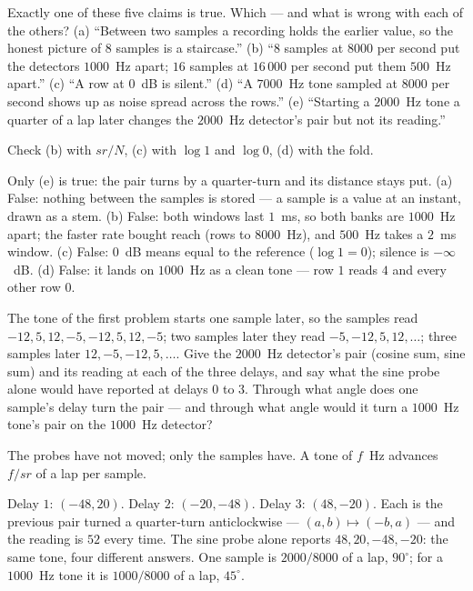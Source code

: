 \begin{problem}
Exactly one of these five claims is true. Which — and what is wrong
with each of the others? (a) ``Between two samples a recording holds
the earlier value, so the honest picture of $8$ samples is a
staircase.'' (b) ``$8$ samples at $8000$ per second put the detectors
$1000$~Hz apart; $16$ samples at $16\,000$ per second put them $500$~Hz
apart.'' (c) ``A row at $0$~dB is silent.'' (d) ``A $7000$~Hz tone
sampled at $8000$ per second shows up as noise spread across the
rows.'' (e) ``Starting a $2000$~Hz tone a quarter of a lap later
changes the $2000$~Hz detector's pair but not its reading.''
\begin{hint}
Check (b) with $sr/N$, (c) with $\log 1$ and $\log 0$, (d) with the
fold.
\end{hint}
\begin{solution}
Only (e) is true: the pair turns by a quarter-turn and its distance
stays put. (a) False: nothing between the samples is stored — a sample
is a value at an instant, drawn as a stem. (b) False: both windows last
$1$~ms, so both banks are $1000$~Hz apart; the faster rate bought reach
(rows to $8000$~Hz), and $500$~Hz takes a $2$~ms window. (c) False:
$0$~dB means equal to the reference ($\log 1 = 0$); silence is
$-\infty$~dB. (d) False: it lands on $1000$~Hz as a clean tone — row
$1$ reads $4$ and every other row $0$.
\end{solution}
\end{problem}

\begin{problem}[stretch]
The tone of the first problem starts one sample later, so the samples
read $-12, 5, 12, -5, -12, 5, 12, -5$; two samples later they read $-5,
-12, 5, 12, \ldots$; three samples later $12, -5, -12, 5, \ldots$.
Give the $2000$~Hz detector's pair (cosine sum, sine sum) and its
reading at each of the three delays, and say what the sine probe alone
would have reported at delays $0$ to $3$. Through what angle does one
sample's delay turn the pair — and through what angle would it turn a
$1000$~Hz tone's pair on the $1000$~Hz detector?
\begin{hint}
The probes have not moved; only the samples have. A tone of $f$~Hz
advances $f/sr$ of a lap per sample.
\end{hint}
\begin{solution}
Delay $1$: $(-48, 20)$. Delay $2$: $(-20, -48)$. Delay $3$: $(48,
-20)$. Each is the previous pair turned a quarter-turn anticlockwise —
$(a, b) \mapsto (-b, a)$ — and the reading is $52$ every time. The sine
probe alone reports $48, 20, -48, -20$: the same tone, four different
answers. One sample is $2000/8000$ of a lap, $90^\circ$; for a
$1000$~Hz tone it is $1000/8000$ of a lap, $45^\circ$.
\end{solution}
\end{problem}
